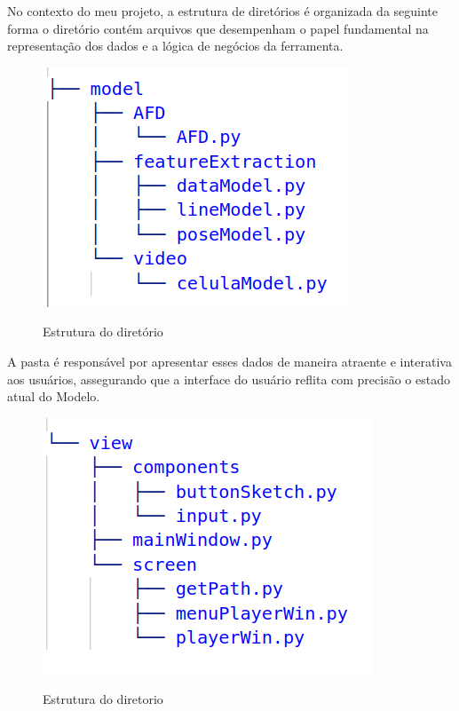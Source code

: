 No contexto do meu projeto, a estrutura de diretórios é organizada da seguinte forma o diretório  contém arquivos que desempenham o papel fundamental na representação dos dados e a lógica de negócios da ferramenta.

\begin{figure}[H]
    \centering
    \caption{Estrutura do diretório }
    \includegraphics[scale=0.5]{figuras/diretorios/model.png}
    \label{fig:model}
\end{figure}



A pasta  é responsável por apresentar esses dados de maneira atraente e interativa aos usuários, assegurando que a interface do usuário reflita com precisão o estado atual do Modelo.

\begin{figure}[H]
	\centering
	\caption{Estrutura do diretorio }
	\includegraphics[scale=0.5]{figuras/diretorios/view.png}
	\label{fig:view}
\end{figure}


